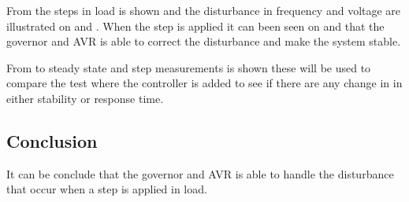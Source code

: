 From  the steps in load is shown and the disturbance in frequency and voltage are illustrated on  and . When the step is applied it can been seen on  and  that the governor and AVR is able to correct the disturbance and make the system stable. 

From  to  steady state and step measurements is shown these will be used to compare the test where the controller is added to see if there are any change in in either stability or response time.




\subsection*{Conclusion}
It can be conclude that the governor and AVR is able to handle the disturbance that occur when a step is applied in load.